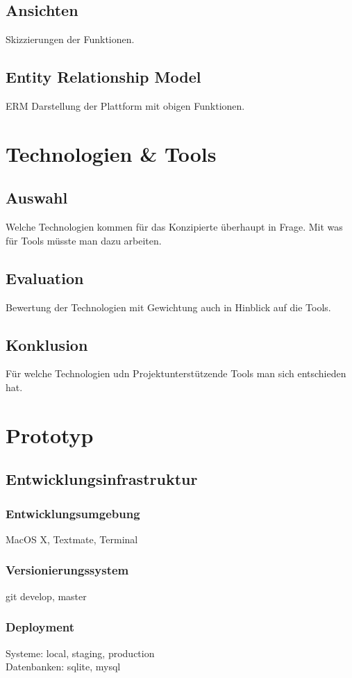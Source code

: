 \documentclass[abstracton,liststotoc,bibtotoc]{scrreprt}
\begin{document}
    \section{Ansichten}
    Skizzierungen der Funktionen.
    \section{Entity Relationship Model}
    ERM Darstellung der Plattform mit obigen Funktionen.
    
    \chapter{Technologien \& Tools}
    \section{Auswahl}
    Welche Technologien kommen für das Konzipierte überhaupt in Frage. Mit
    was für Tools müsste man dazu arbeiten.
    \section{Evaluation}
    Bewertung der Technologien mit Gewichtung auch in Hinblick auf die Tools.
    \section{Konklusion}
    Für welche Technologien udn Projektunterstützende Tools man sich 
    entschieden hat.
    
    \chapter{Prototyp}
    \section{Entwicklungsinfrastruktur}
    \subsection{Entwicklungsumgebung}
    MacOS X, Textmate, Terminal
    \subsection{Versionierungssystem}
    git develop, master
    \subsection{Deployment}
    Systeme: local, staging, production\\
    Datenbanken: sqlite, mysql
\end{document}
